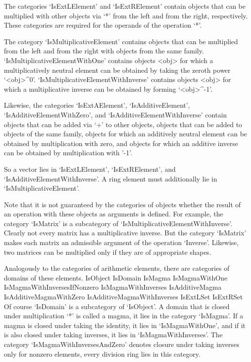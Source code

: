The categories `IsExtLElement' and `IsExtRElement' contain objects
that can be multiplied with other objects via `*' from the left and
from the right, respectively.
These categories are required for the operands of the operation `*'.

The category `IsMultiplicativeElement' contains objects that can be
multiplied from the left and from the right with objects from the
same family.
`IsMultiplicativeElementWithOne' contains objects <obj> for which a
multiplicatively neutral element can be obtained by taking the
zeroth power `<obj>^0'.
`IsMultiplicativeElementWithInverse' contains objects <obj> for which a
multiplicative inverse can be obtained by forming `<obj>^-1'.

Likewise, the categories `IsExtAElement', `IsAdditiveElement',
`IsAdditiveElementWithZero', and `IsAdditiveElementWithInverse'
contain objects that can be added via `+' to other objects,
objects that can be added to objects of the same family,
objects for which an additively neutral element can be obtained by
multiplication with zero,
and objects for which an additive inverse can be obtained by
multiplication with '-1'.

So a vector lies in `IsExtLElement', `IsExtRElement', and
`IsAdditiveElementWithInverse'.
A ring element must additionally lie in `IsMultiplicativeElement'.

Note that it is not guaranteed by the categories of objects whether
the result of an operation with these objects as arguments is defined.
For example, the category `IsMatrix' is a subcategory of
`IsMultiplicativeElementWithInverse'.
Clearly not every matrix has a multiplicative inverse.
But the category `IsMatrix' makes each matrix an admissible argument of
the operation `Inverse'.
Likewise, two matrices can be multiplied only if they are of appropriate
shapes.

Analogously to the categories of arithmetic elements,
there are categories of domains of these elements.
\begintt
    IsObject
        IsDomain
            IsMagma
                IsMagmaWithOne
                    IsMagmaWithInversesIfNonzero
                        IsMagmaWithInverses
            IsAdditiveMagma
                IsAdditiveMagmaWithZero
                    IsAdditiveMagmaWithInverses
            IsExtLSet
            IsExtRSet
\endtt
Of course `IsDomain' is a subcategory of `IsObject'.
A domain that is closed under multiplication `*' is called a magma,
it lies in the category `IsMagma'.
If a magma is closed under taking the identity,
it lies in `IsMagmaWithOne',
and if it is also closed under taking inverses,
it lies in `IsMagmaWithInverses'.
The category `IsMagmaWithInversesAndZero' denotes closure under
taking inverses only for nonzero elements,
every division ring lies in this category.

